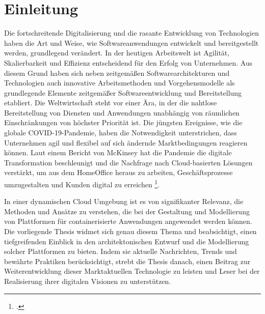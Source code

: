 \newpage
\section{Einleitung}\label{lab:einleitung}
Die fortschreitende Digitalisierung und die rasante Entwicklung von Technologien haben die Art und Weise, wie Softwareanwendungen entwickelt und bereitgestellt werden, grundlegend verändert. In der heutigen Arbeitswelt ist Agilität, Skalierbarkeit und Effizienz entscheidend für den Erfolg von Unternehmen. Aus diesem Grund haben sich neben zeitgemäßen Softwarearchitekturen und Technologien auch innovative Arbeitsmethoden und Vorgehensmodelle als grundlegende Elemente zeitgemäßer Softwareentwicklung und Bereitstellung etabliert. Die Weltwirtschaft steht vor einer Ära, in der die nahtlose Bereitstellung von Diensten und Anwendungen unabhängig von räumlichen Einschränkungen von höchster Priorität ist. Die jüngsten Ereignisse, wie die globale COVID-19-Pandemie, haben die Notwendigkeit unterstrichen, dass Unternehmen agil und flexibel auf sich ändernde Marktbedingungen reagieren können. Laut einem Bericht von McKinsey hat die Pandemie die digitale Transformation beschleunigt und die Nachfrage nach Cloud-basierten Lösungen verstärkt, um aus dem HomeOffice heraus zu arbeiten, Geschäftsprozesse umzugestalten und Kunden digital zu erreichen \footcite[Vgl.][o.S.]{McKinsey2020}.

In einer dynamischen Cloud Umgebung ist es von signifikanter Relevanz, die Methoden und Ansätze zu verstehen, die bei der Gestaltung und Modellierung von \cn Plattformen für containerisierte Anwendungen angewendet werden können. Die vorliegende Thesis widmet sich genau diesem Thema und beabsichtigt, einen tiefgreifenden Einblick in den architektonischen Entwurf und die Modellierung solcher Plattformen zu bieten. Indem sie aktuelle Nachrichten, Trends und bewährte Praktiken berücksichtigt, strebt die Thesis danach, einen Beitrag zur Weiterentwicklung dieser Marktaktuellen Technologie zu leisten und Leser bei der Realisierung ihrer digitalen Visionen zu unterstützen.


